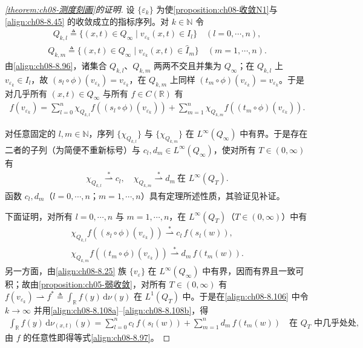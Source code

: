 \documentclass[../../main.tex]{subfiles}%
\begin{document}
\begin{proof}[\cref{theorem:ch08-测度刻画}的证明]
设 $\{\varepsilon_k\}$ 为使\cref{proposition:ch08-收敛N1}与\eqref{align:ch08-8.45} 的收敛成立的指标序列。对 $k\in\mathbb{N}$ 令
\begin{align*}
Q_{k,l}\triangleq \{(x,t)\in Q_\infty\mid v_{\varepsilon_k}(x,t)\in I_l\}\quad(l=0,\cdots ,n),
\end{align*}
\begin{align*}
Q_{k,m}\triangleq \{(x,t)\in Q_\infty\mid v_{\varepsilon_k}(x,t)\in\widehat I_m\}\quad(m=1,\cdots ,n).
\end{align*}
由\eqref{align:ch08-8.96}，诸集合 $Q_{k,l}$、$Q_{k,m}$ 两两不交且并集为 $Q_\infty$；在 $Q_{k,l}$ 上 $v_{\varepsilon_k}\in I_l$，故 $(s_l\circ\phi)(v_{\varepsilon_k})=v_{\varepsilon_k}$，在 $Q_{k,m}$ 上同样 $(t_m\circ\phi)(v_{\varepsilon_k})=v_{\varepsilon_k}$。于是对几乎所有 $(x,t)\in Q_\infty$ 与所有 $f\in C(\mathbb{R})$ 有
\begin{align}
f(v_{\varepsilon_k})=\sum_{l=0}^n\chi_{Q_{k,l}}f((s_l\circ\phi)(v_{\varepsilon_k}))
+\sum_{m=1}^n\chi_{Q_{k,m}}f((t_m\circ\phi)(v_{\varepsilon_k})). \label{align:ch08-8.106}
\end{align}

对任意固定的 $l,m\in\mathbb{N}$，序列 $\{\chi_{Q_{k,l}}\}$ 与 $\{\chi_{Q_{k,m}}\}$ 在 $L^\infty(Q_\infty)$ 中有界。于是存在二者的子列（为简便不重新标号）与 $c_l,d_m\in L^\infty(Q_\infty)$，使对所有 $T\in(0,\infty)$ 有
\begin{align}
\chi_{Q_{k,l}}\stackrel{*}{\rightharpoonup}c_l,\quad
\chi_{Q_{k,m}}\stackrel{*}{\rightharpoonup}d_m\ \text{在 }L^\infty(Q_T). \label{align:ch08-8.107}
\end{align}
函数 $c_l,d_m$（$l=0,\cdots ,n$；$m=1,\cdots ,n$）具有定理所述性质，其验证见补证。

下面证明，对所有 $l=0,\cdots ,n$ 与 $m=1,\cdots ,n$，在 $L^\infty(Q_T)$（$T\in(0,\infty)$）中有
\begin{align}
\chi_{Q_{k,l}}f((s_l\circ\phi)(v_{\varepsilon_k}))\stackrel{*}{\rightharpoonup}c_l\,f(s_l(w)), \label{align:ch08-8.108a}\\
\chi_{Q_{k,m}}f((t_m\circ\phi)(v_{\varepsilon_k}))\stackrel{*}{\rightharpoonup}d_m\,f(t_m(w)). \label{align:ch08-8.108b}
\end{align}
另一方面，由\eqref{align:ch08-8.25} 族 $\{v_\varepsilon\}$ 在 $L^\infty(Q_\infty)$ 中有界，因而有界且一致可积；故由\cref{proposition:ch05-弱收敛}，对所有 $T\in(0,\infty)$ 有 $f(v_{\varepsilon_k})\rightharpoonup f^*\triangleq\int_{\mathbb{R}}f(y)\,\mathrm{d}\nu(y)$ 在 $L^1(Q_T)$ 中。于是在\eqref{align:ch08-8.106} 中令 $k\to\infty$ 并用\eqref{align:ch08-8.108a}--\eqref{align:ch08-8.108b}，得
\begin{align*}
\int_{\mathbb{R}}f(y)\,\mathrm{d}\nu_{(x,t)}(y)
=\sum_{l=0}^n c_l\,f(s_l(w))+\sum_{m=1}^n d_m\,f(t_m(w))\quad\text{在 }Q_T\text{ 中几乎处处},
\end{align*}
由 $f$ 的任意性即得等式\eqref{align:ch08-8.97}。


\end{proof}
\end{document}
